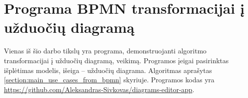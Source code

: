 \section{Programa BPMN transformacijai į užduočių diagramą}


Vienas iš šio darbo tikslų yra programa, demonstruojanti algoritmo \BPMN{} transformacijai į užduočių diagramą, veikimą. Programos įeigai pasirinktas \BPMN{} išplėtimas \DVCM{} modelis, išeiga – užduočių diagrama. Algoritmas aprašytas \ref{section:main_use_cases_from_bpmn} skyriuje. Programos kodas yra \href{https://github.com/Aleksandras-Sivkovas/diagrams-editor-app}{https://github.com/Aleksandras-Sivkovas/diagrams-editor-app}.




